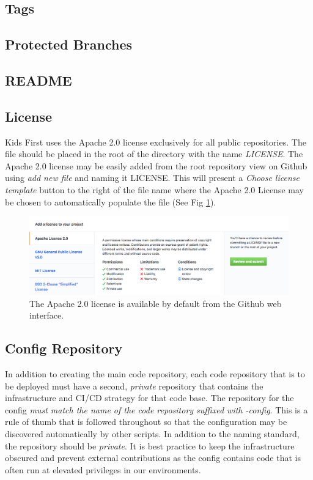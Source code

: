 \documentclass[a4paper,12pt,titlepage]{scrartcl}
\begin{document}
	\subsection{Tags}
	
	\subsection{Protected Branches}
	
	\subsection{README}
	
	\subsection{License}
	
	Kids First uses the Apache 2.0 \cite{apache2} license exclusively for all public repositories.
	The file should be placed in the root of the directory with the name {\em LICENSE}.
	The Apache 2.0 license may be easily added from the root repository view on Github using {\em add new file} and naming it LICENSE.
	This will present a {\em Choose license template} button to the right of the file name where the Apache 2.0 License may be chosen to automatically populate the file (See Fig \ref{fig:addlicense}).
	
	\begin{figure}
    		\centering
    		\includegraphics[width=0.8\linewidth]{images/license.png}
    		\caption{The Apache 2.0 license is available by default from the Github web interface.}
    		\label{fig:addlicense}
    \end{figure}
	
	\subsection{Config Repository}
	
	In addition to creating the main code repository, each code repository that is to be deployed must have a second, {\em private} repository that contains the infrastructure and CI/CD strategy for that code base.
	The repository for the config {\em must match the name of the code repository suffixed with -config}.
	This is a rule of thumb that is followed throughout so that the configuration may be discovered automatically by other scripts.
	In addition to the naming standard, the repository should be {\em private}.
	It is best practice to keep the infrastructure obscured and prevent external contributions as the config contains code that is often run at elevated privileges in our environments.
	
\end{document}
